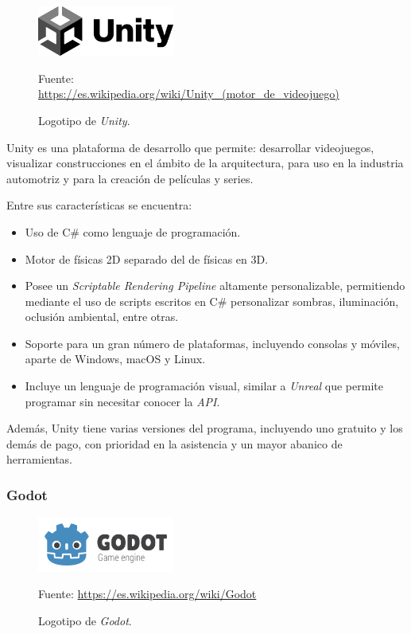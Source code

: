 \documentclass[a4paper,11pt]{book}
\begin{document}
\begin{figure}[H]
   \centering
   \includegraphics[width=0.4\textwidth]{imagenes/UNITY_LOGO.png}
   \caption{Logotipo de \textit{Unity}.}
   \vspace{10pt}
   \footnotesize{Fuente: \url{https://es.wikipedia.org/wiki/Unity_(motor_de_videojuego)}}
\end{figure}

Unity \cite{unity} es una plataforma de desarrollo que permite: desarrollar videojuegos, visualizar construcciones en el ámbito de la arquitectura, para uso en la industria automotriz y para la creación de películas y series.

\bigskip

Entre sus características se encuentra:

\begin{itemize}
   \item Uso de C\# como lenguaje de programación.
   \item Motor de físicas 2D separado del de físicas en 3D.
   \item Posee un \textit{Scriptable Rendering Pipeline} altamente personalizable, permitiendo mediante el uso de scripts escritos en C\# personalizar sombras, iluminación, oclusión ambiental, entre otras.
   \item Soporte para un gran número de plataformas, incluyendo consolas y móviles, aparte de Windows, macOS y Linux.
   \item Incluye un lenguaje de programación visual, similar a \textit{Unreal} que permite programar sin necesitar conocer la \textit{API}.
\end{itemize}
   
Además, Unity tiene varias versiones del programa, incluyendo uno gratuito y los demás de pago, con prioridad en la asistencia y un mayor abanico de herramientas.

\subsubsection{Godot}

\begin{figure}[H]
   \centering
   \includegraphics[width=0.4\textwidth]{imagenes/GODOT_LOGO.png}
   \caption{Logotipo de \textit{Godot}.}
   \vspace{10pt}
   \footnotesize{Fuente: \url{https://es.wikipedia.org/wiki/Godot}}
\end{figure}
\end{document}
